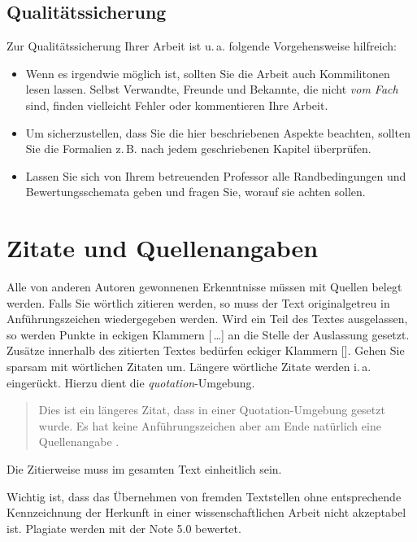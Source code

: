 \documentclass[conference,compsoc,final,a4paper]{IEEEtran}
\begin{document}
    \subsection{Qualitätssicherung}
    Zur Qualitätssicherung Ihrer Arbeit ist u.\,a. folgende Vorgehensweise hilfreich:
    \begin{itemize}
        \item Wenn es irgendwie möglich ist, sollten Sie die Arbeit auch Kommilitonen lesen lassen. Selbst Verwandte, Freunde und Bekannte, die nicht \emph{vom Fach} sind, finden vielleicht Fehler oder kommentieren Ihre Arbeit.
        \item Um sicherzustellen, dass Sie die hier beschriebenen Aspekte beachten, sollten Sie die Formalien z.\,B. nach jedem geschriebenen Kapitel überprüfen.
        \item Lassen Sie sich von Ihrem betreuenden Professor alle Randbedingungen und Bewertungsschemata geben und fragen Sie, worauf sie achten sollen.
    \end{itemize}



    \section{Zitate und Quellenangaben}\label{quellen}
    Alle von anderen Autoren gewonnenen Erkenntnisse müssen mit Quellen belegt werden. Falls Sie wörtlich zitieren werden, so muss der Text originalgetreu in Anführungszeichen wiedergegeben werden. Wird ein Teil des Textes ausgelassen, so werden Punkte in eckigen Klammern [\,\dots] an die Stelle der Auslassung gesetzt. Zusätze innerhalb des zitierten Textes bedürfen eckiger Klammern []. Gehen Sie sparsam mit wörtlichen Zitaten um. Längere wörtliche Zitate werden i.\,a. eingerückt. Hierzu dient die \textit{quotation}-Umgebung.

    \begin{quotation}
        Dies ist ein längeres Zitat, dass in einer Quotation-Umgebung gesetzt wurde. Es hat keine Anführungszeichen aber am Ende natürlich eine Quellenangabe \cite{Kornmeier2011}.
    \end{quotation}

    Die Zitierweise muss im gesamten Text einheitlich sein.

    Wichtig ist, dass das Übernehmen von fremden Textstellen ohne entsprechende Kennzeichnung der Herkunft in einer wissenschaftlichen Arbeit nicht akzeptabel ist. Plagiate werden mit der Note 5.0 bewertet.
\end{document}
